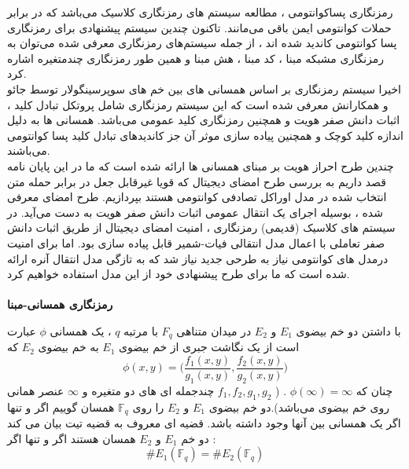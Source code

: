 \documentclass[12pt,a4paper]{book}
\begin{document}
رمزنگاری پساکوانتومی ، مطالعه سیستم های رمزنگاری کلاسیک  می‌باشد که در برابر حملات کوانتومی ایمن باقی می‌مانند.
تاکنون چندین سیستم پیشنهادی برای رمزنگاری پسا کوانتومی کاندید شده اند ، از جمله سیستم‌های رمزنگاری  معرفی شده می‌توان به رمزنگاری مشبکه مبنا ، کد مبنا ، هش مبنا و همین طور رمزنگاری چندمتغیره اشاره کرد.
\\
اخیرا سیستم رمزنگاری بر اساس همسانی های بین خم های سوپرسینگولار توسط جائو و همکارانش 
معرفی شده است که این سیستم رمزنگاری شامل پروتکل تبادل کلید ، اثبات دانش صفر هویت و همچنین رمزنگاری کلید عمومی می‌باشد. 
همسانی ها به دلیل اندازه کلید کوچک و همچنین پیاده سازی موثر آن 
جز کاندیدهای تبادل کلید پسا کوانتومی می‌باشند.
\\
چندین طرح احراز هویت بر مبنای همسانی ها ارائه شده است که ما در این پایان نامه قصد داریم به بررسی  طرح امضای دیجیتال که قویا غیرقابل جعل در برابر حمله متن انتخاب شده
در مدل اوراکل تصادفی کوانتومی هستند 
بپردازیم. 
طرح امضای معرفی شده ، بوسیله اجرای یک انتقال عمومی اثبات دانش صفر هویت 
به دست می‌آید. در سیستم های کلاسیک (قدیمی) رمزنگاری ، امنیت امضای دیجیتال از طریق اثبات دانش صفر تعاملی
با اعمال مدل انتقالی فیات-شمیر
قابل پیاده سازی بود. اما برای امنیت درمدل های کوانتومی نیاز به طرحی جدید نیاز شد که به تازگی
مدل انتقال آنره
ارائه شده است که ما برای طرح پیشنهادی خود از این مدل استفاده خواهیم کرد.
\\
\\
\textbf{رمزنگاری همسانی-مبنا}

با داشتن دو خم بیضوی 
$ E_1 $
و
$ E_2 $
در میدان متناهی 
$F_q $
با مرتبه 
$q$
، یک همسانی 
$\phi$
عبارت است از یک نگاشت جبری از خم بیضوی
$E_1$
به خم بیضوی
$E_2$
که 
$$ \phi(x,y) = \Big(\frac{f_1(x,y)}{g_1(x,y)} , \frac{f_2(x,y)}{g_2(x,y)}\Big) $$
چنان که 
$\phi(\infty) = \infty$
. (
$f_1,f_2,g_1,g_2$
چندجمله ای های دو متغیره و 
$\infty$
عنصر همانی روی خم بیضوی می‌باشد).دو خم بیضوی 
$E_1$
و
$E_2$
را روی 
$\mathbb{F}_q$
همسان گوییم اگر و تنها اگر یک همسانی بین آنها وجود داشته باشد. قضیه ای معروف به قضیه تیت 
بیان می کند دو خم 
$E_1$
و
$E_2$
همسان هستند اگر و تنها اگر : 
$$ \# E_1(\mathbb{F}_q) =  \# E_2(\mathbb{F}_q)$$
\end{document}
